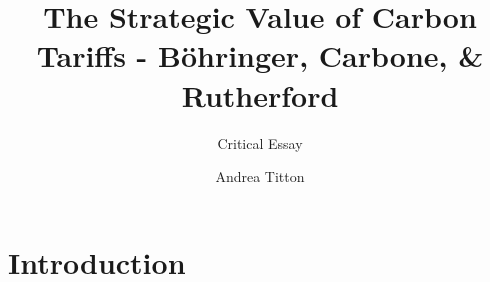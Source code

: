 \documentclass[american]{scrartcl}
\title{The Strategic Value of Carbon Tariffs - Böhringer, Carbone, \& Rutherford}
\subtitle{Critical Essay}
\author{Andrea Titton}
\begin{document}
\maketitle


\section{Introduction}

\newpage
\nocite{*}
\printbibliography
\end{document}
